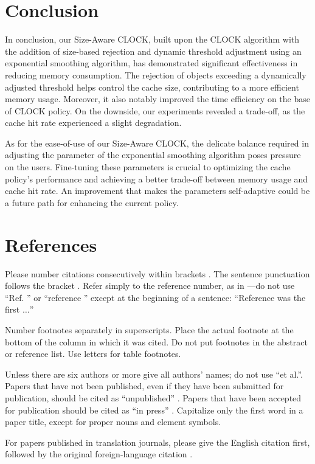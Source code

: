 \documentclass[conference]{IEEEtran}
\begin{document}
\section{Conclusion}
In conclusion, our Size-Aware CLOCK, built upon the CLOCK algorithm with the addition of size-based rejection and dynamic threshold adjustment using an exponential smoothing algorithm, has demonstrated significant effectiveness in reducing memory consumption. The rejection of objects exceeding a dynamically adjusted threshold helps control the cache size, contributing to a more efficient memory usage. Moreover, it also notably improved the time efficiency on the base of CLOCK policy. On the downside, our experiments revealed a trade-off, as the cache hit rate experienced a slight degradation.

As for the ease-of-use of our Size-Aware CLOCK, the delicate balance required in adjusting the parameter of the exponential smoothing algorithm poses pressure on the users. Fine-tuning these parameters is crucial to optimizing the cache policy's performance and achieving a better trade-off between memory usage and cache hit rate. An improvement that makes the parameters self-adaptive could be a future path for enhancing the current policy.

\section*{References}

Please number citations consecutively within brackets \cite{b1}. The
sentence punctuation follows the bracket \cite{b2}. Refer simply to the reference
number, as in \cite{b3}---do not use ``Ref. \cite{b3}'' or ``reference \cite{b3}'' except at
the beginning of a sentence: ``Reference \cite{b3} was the first $\ldots$''

Number footnotes separately in superscripts. Place the actual footnote at
the bottom of the column in which it was cited. Do not put footnotes in the
abstract or reference list. Use letters for table footnotes.

Unless there are six authors or more give all authors' names; do not use
``et al.''. Papers that have not been published, even if they have been
submitted for publication, should be cited as ``unpublished'' \cite{b4}. Papers
that have been accepted for publication should be cited as ``in press'' \cite{b5}.
Capitalize only the first word in a paper title, except for proper nouns and
element symbols.

For papers published in translation journals, please give the English
citation first, followed by the original foreign-language citation \cite{b6}.
\end{document}
